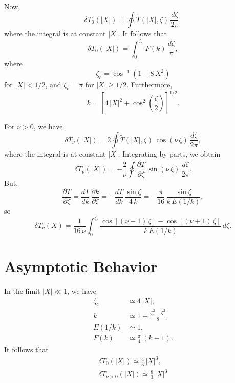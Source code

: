 \documentclass[12pt,prb,aps,notitlepage]{revtex4-1}
\begin{document}
Now,
\begin{equation}
\delta T_0(|X|) = \oint\tilde{T}(|X|,\zeta)\,\frac{d\zeta}{2\pi},
\end{equation}
where the integral is at constant $|X|$. It follows that
\begin{equation}
\delta T_0(|X|) =  \int_0^{\zeta_c}\,F(k)\,\frac{d\zeta}{\pi},
\end{equation}
where 
\begin{equation}
\zeta_c = \cos^{-1}\left(1-8\,X^2\right)
\end{equation}
for $|X|< 1/2$, and $\zeta_c=\pi$ for $|X|\geq 1/2$. Furthermore, 
\begin{equation}
k = \left[4\,|X|^2+\cos^2\left(\frac{\zeta}{2}\right)\right]^{1/2}.
\end{equation}

For $\nu>0$, we have
\begin{equation}
\delta T_\nu(|X|) = 2\oint \tilde{T}(|X|,\zeta)\,\cos(\nu\,\zeta)\,\frac{d\zeta}{2\pi},
\end{equation}
where the integral is at constant $|X|$. Integrating by parts, we obtain
\begin{equation}
\delta T_\nu(|X|) =-\frac{2}{\nu}\oint\frac{\partial\tilde{T}}{\partial \zeta}\,\sin(\nu\,\zeta)\,\frac{d\zeta}{2\pi}.
\end{equation}
But,
\begin{equation}
\frac{\partial T}{\partial \zeta}=\frac{dT}{dk}\,\frac{\partial k}{\partial\zeta}=-\frac{dT}{dk}\,\frac{\sin\zeta}{4\,k} = -\frac{\pi}{16}\,\frac{\sin\zeta}{k\,E(1/k)},
\end{equation}
so
\begin{equation}
\delta T_\nu(X) =\frac{1}{16\,\nu} \int_0^{\zeta_c}\frac{\cos[(\nu-1)\,\zeta]-\cos[(\nu+1)\,\zeta]}{k\,E(1/k)}\,d\zeta.
\end{equation}

\section{Asymptotic Behavior}
In the limit $|X| \ll 1$, we have
\begin{align}
\zeta_c &\simeq 4\,|X|,\\[0.5ex]
k &\simeq 1 + \frac{\zeta_c^{\,2}-\zeta^2}{8},\\[0.5ex]
E(1/k)&\simeq 1,\\[0.5ex]
F(k)&\simeq \frac{\pi}{4}\,(k-1).
\end{align}
It follows that
\begin{align}
\delta T_0(|X|) \simeq \frac{4}{3}\,|X|^3,\\[0.5ex]
\delta T_{\nu>0}(|X|) \simeq \frac{8}{3}\,|X|^3
\end{align}
\end{document}
